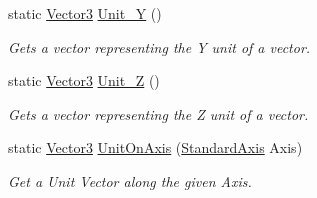 \begin{DoxyCompactItemize}
static \hyperlink{classMezzanine_1_1Vector3}{Vector3} \hyperlink{classMezzanine_1_1Vector3_a62285c6842027aec46da54553c22bc61}{Unit\_\-Y} ()
\begin{DoxyCompactList}\small\item\em Gets a vector representing the Y unit of a vector. \item\end{DoxyCompactList}\item 
static \hyperlink{classMezzanine_1_1Vector3}{Vector3} \hyperlink{classMezzanine_1_1Vector3_a6a70011d21182d44fd458458b1627ea1}{Unit\_\-Z} ()
\begin{DoxyCompactList}\small\item\em Gets a vector representing the Z unit of a vector. \item\end{DoxyCompactList}\item 
static \hyperlink{classMezzanine_1_1Vector3}{Vector3} \hyperlink{classMezzanine_1_1Vector3_a3692a8fd777e4a30150b570d3fcba346}{UnitOnAxis} (\hyperlink{namespaceMezzanine_ab41a00a8c6a47b576dc987ec34e16ba1}{StandardAxis} Axis)
\begin{DoxyCompactList}\small\item\em Get a Unit Vector along the given Axis. \item\end{DoxyCompactList}\end{DoxyCompactItemize}
